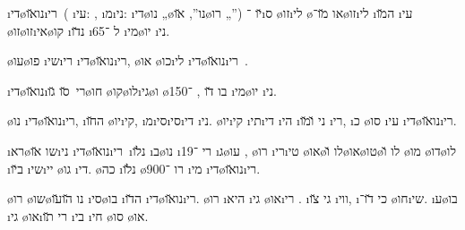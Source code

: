 \newcommand{\dinozaurim}{\i{די}\o{נו}\u{או}\i{רי}\x{ם}}

\dinozaurim\ ( \i{עי}: , \i{מ}\i{ני}:  \i{די}\o{נו} „\o{נו}”,  \u{או}\o{רו} „”) \u{יו} ־\i{ס}  \o{זו}\i{לי} \o{או} \u{מו}־\o{זו}\i{לי} \i{ה}\u{מו} \i{עי} \o{זו}\o{זו}\i{אי}\o{קו} \i{נ}\u{דו} \i{ל} ־65 \i{מי}\o{יו} \i{ני}.

\o{עו}\o{פו}   \i{שי}\i{רי}  \dinozaurim, \o{או}  \o{כו}\i{לי}  \dinozaurim\ .

\dinozaurim\ \u{סו} \u{גו}\o{חו} \o{קו}\o{לו}\i{גי}\o{ו} \o{בו}   \u{דו} ,  ־150 \i{מי}\o{יו} \i{ני}.

\o{נו} \dinozaurim, \i{ה}\u{חו} \o{יו}\i{קי}, \i{מ}\i{סי}\i{סי}\i{די} \i{ני}. \o{יו}\i{קי} \i{תי}\i{די} \i{הי} \i{ני} \u{ו}\u{מו} \i{רי}, \i{כ}  \o{סו} \i{עי} \dinozaurim.

\i{רא}\o{שו} \u{או}\i{ני}  \dinozaurim\ \i{נ}\u{לו} \i{ב}\o{נו} \i{רי}   ־19   \i{ג}\o{עו} , \o{רו} \i{רי}\i{טי}  \o{או}\o{לו} \u{ו}\o{או}\o{טו}\o{לו} \u{ו} \o{מו} \o{דו}\o{לו} \i{ב}\u{יו} \i{שי}\i{יי} \o{גו}  \i{די}.
 \o{כה} \i{נ}\u{לו} \o{רו} ־900 \i{מי} \dinozaurim.

\o{רו} \o{שו}\o{נו} \u{הו}\u{עו}  \i{סי}\o{בו} \i{ה}\u{דו}  \dinozaurim. \o{רו}  \i{היא} \i{גי} \o{או}\i{רי} . \i{גי}     \u{צו} \i{ווי},  \i{כי}  \u{דו}־      \o{חו}\i{שי}. \i{ע}\o{בו} \i{גי} \o{או}\i{רי} \u{תו} \i{בי} \i{חי}  \o{סו} \o{או}.

